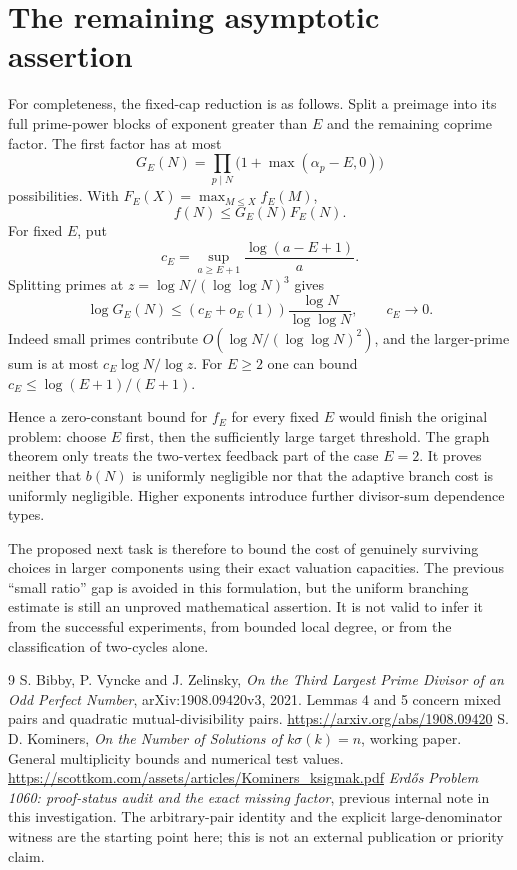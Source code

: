 \documentclass[11pt]{article}
\begin{document}
\section{The remaining asymptotic assertion}
For completeness, the fixed-cap reduction is as follows. Split a preimage into its full prime-power blocks of exponent greater than $E$ and the remaining coprime factor. The first factor has at most
\[
 G_E(N)=\prod_{p\mid N}\bigl(1+\max(\alpha_p-E,0)\bigr)
\]
possibilities. With $F_E(X)=\max_{M\le X}f_E(M)$,
\[
 f(N)\le G_E(N)F_E(N).
\]
For fixed $E$, put
\[
 c_E=\sup_{a\ge E+1}\frac{\log(a-E+1)}a.
\]
Splitting primes at $z=\log N/(\log\log N)^3$ gives
\[
 \log G_E(N)\le(c_E+o_E(1))\frac{\log N}{\log\log N},\qquad c_E\longrightarrow0.
\]
Indeed small primes contribute $O(\log N/(\log\log N)^2)$, and the larger-prime sum is at most $c_E\log N/\log z$. For $E\ge2$ one can bound $c_E\le\log(E+1)/(E+1)$.

Hence a zero-constant bound for $f_E$ for every fixed $E$ would finish the original problem: choose $E$ first, then the sufficiently large target threshold. The graph theorem only treats the two-vertex feedback part of the case $E=2$. It proves neither that $b(N)$ is uniformly negligible nor that the adaptive branch cost is uniformly negligible. Higher exponents introduce further divisor-sum dependence types.

The proposed next task is therefore to bound the cost of genuinely surviving choices in larger components using their exact valuation capacities. The previous ``small ratio'' gap is avoided in this formulation, but the uniform branching estimate is still an unproved mathematical assertion. It is not valid to infer it from the successful experiments, from bounded local degree, or from the classification of two-cycles alone.

\begin{thebibliography}{9}
 S. Bibby, P. Vyncke and J. Zelinsky, \emph{On the Third Largest Prime Divisor of an Odd Perfect Number}, arXiv:1908.09420v3, 2021. Lemmas 4 and 5 concern mixed pairs and quadratic mutual-divisibility pairs.\newline
\url{https://arxiv.org/abs/1908.09420}
 S. D. Kominers, \emph{On the Number of Solutions of $k\sigma(k)=n$}, working paper. General multiplicity bounds and numerical test values.\newline
\url{https://scottkom.com/assets/articles/Kominers_ksigmak.pdf}
 \emph{Erd\H{o}s Problem 1060: proof-status audit and the exact missing factor}, previous internal note in this investigation. The arbitrary-pair identity and the explicit large-denominator witness are the starting point here; this is not an external publication or priority claim.
\end{thebibliography}
\end{document}
